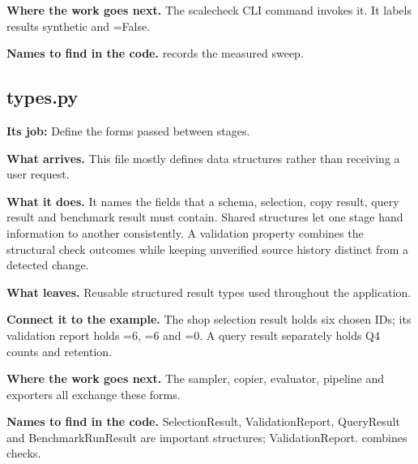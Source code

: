 \textbf{Where the work goes next.} The scalecheck CLI command invokes it. It labels results synthetic and =False.

\textbf{Names to find in the code.}  records the measured sweep.


\subsection{types.py}

\textbf{Its job:} Define the forms passed between stages.

\textbf{What arrives.} This file mostly defines data structures rather than receiving a user request.

\textbf{What it does.} It names the fields that a schema, selection, copy result, query result and benchmark result must contain. Shared structures let one stage hand information to another consistently. A validation property combines the structural check outcomes while keeping unverified source history distinct from a detected change.

\textbf{What leaves.} Reusable structured result types used throughout the application.

\textbf{Connect it to the example.} The shop selection result holds six chosen IDs; its validation report holds =6, =6 and =0. A query result separately holds Q4 counts and retention.

\textbf{Where the work goes next.} The sampler, copier, evaluator, pipeline and exporters all exchange these forms.

\textbf{Names to find in the code.} SelectionResult, ValidationReport, QueryResult and BenchmarkRunResult are important structures; ValidationReport. combines checks.